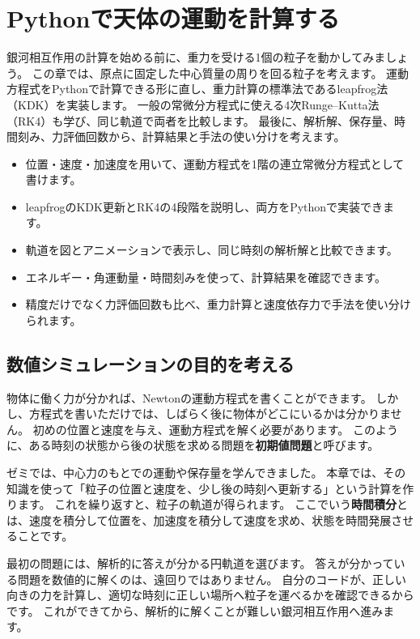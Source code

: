 \chapter{Pythonで天体の運動を計算する}
\label{chap:motion}

銀河相互作用の計算を始める前に、重力を受ける1個の粒子を動かしてみましょう。
この章では、原点に固定した中心質量の周りを回る粒子を考えます。
運動方程式をPythonで計算できる形に直し、重力計算の標準法であるleapfrog法（KDK）を実装します。
一般の常微分方程式に使える4次Runge--Kutta法（RK4）も学び、同じ軌道で両者を比較します。
最後に、解析解、保存量、時間刻み、力評価回数から、計算結果と手法の使い分けを考えます。

\begin{goalbox}[この章で学ぶこと]
\begin{itemize}
\item 位置・速度・加速度を用いて、運動方程式を1階の連立常微分方程式として書けます。
\item leapfrogのKDK更新とRK4の4段階を説明し、両方をPythonで実装できます。
\item 軌道を図とアニメーションで表示し、同じ時刻の解析解と比較できます。
\item エネルギー・角運動量・時間刻みを使って、計算結果を確認できます。
\item 精度だけでなく力評価回数も比べ、重力計算と速度依存力で手法を使い分けられます。
\end{itemize}
\end{goalbox}

\section{数値シミュレーションの目的を考える}
\label{sec:ch1-purpose}

物体に働く力が分かれば、Newtonの運動方程式を書くことができます。
しかし、方程式を書いただけでは、しばらく後に物体がどこにいるかは分かりません。
初めの位置と速度を与え、運動方程式を解く必要があります。
このように、ある時刻の状態から後の状態を求める問題を\textbf{初期値問題}と呼びます。

ゼミでは、中心力のもとでの運動や保存量を学んできました。
本章では、その知識を使って「粒子の位置と速度を、少し後の時刻へ更新する」という計算を作ります。
これを繰り返すと、粒子の軌道が得られます。
ここでいう\textbf{時間積分}とは、速度を積分して位置を、加速度を積分して速度を求め、状態を時間発展させることです。

最初の問題には、解析的に答えが分かる円軌道を選びます。
答えが分かっている問題を数値的に解くのは、遠回りではありません。
自分のコードが、正しい向きの力を計算し、適切な時刻に正しい場所へ粒子を運べるかを確認できるからです。
これができてから、解析的に解くことが難しい銀河相互作用へ進みます。

